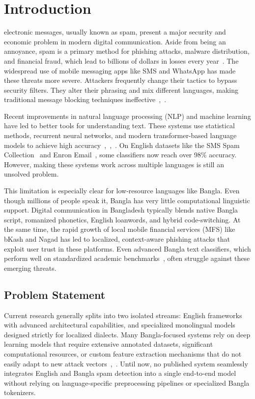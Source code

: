 \documentclass[journal]{IEEEtran}
\begin{document}
\section{Introduction}

 electronic messages, usually known as spam, present a major security and economic problem in modern digital communication. Aside from being an annoyance, spam is a primary method for phishing attacks, malware distribution, and financial fraud, which lead to billions of dollars in losses every year~\cite{ref1}. The widespread use of mobile messaging apps like SMS and WhatsApp has made these threats more severe. Attackers frequently change their tactics to bypass security filters. They alter their phrasing and mix different languages, making traditional message blocking techniques ineffective~\cite{ref5},~\cite{ref6}.

Recent improvements in natural language processing (NLP) and machine learning have led to better tools for understanding text. These systems use statistical methods, recurrent neural networks, and modern transformer-based language models to achieve high accuracy~\cite{ref4},~\cite{ref7},~\cite{ref9}. On English datasets like the SMS Spam Collection~\cite{ref1} and Enron Email~\cite{ref9}, some classifiers now reach over 98\% accuracy. However, making these systems work across multiple languages is still an unsolved problem.

This limitation is especially clear for low-resource languages like Bangla. Even though millions of people speak it, Bangla has very little computational linguistic support. Digital communication in Bangladesh typically blends native Bangla script, romanized phonetics, English loanwords, and hybrid code-switching. At the same time, the rapid growth of local mobile financial services (MFS) like bKash and Nagad has led to localized, context-aware phishing attacks that exploit user trust in these platforms. Even advanced Bangla text classifiers, which perform well on standardized academic benchmarks~\cite{ref7}, often struggle against these emerging threats.

\subsection{Problem Statement}

Current research generally splits into two isolated streams: English frameworks with advanced architectural capabilities, and specialized monolingual models designed strictly for localized dialects. Many Bangla-focused systems rely on deep learning models that require extensive annotated datasets, significant computational resources, or custom feature extraction mechanisms that do not easily adapt to new attack vectors~\cite{ref7},~\cite{ref10}. Until now, no published system seamlessly integrates English and Bangla spam detection into a single end-to-end model without relying on language-specific preprocessing pipelines or specialized Bangla tokenizers.
\end{document}
